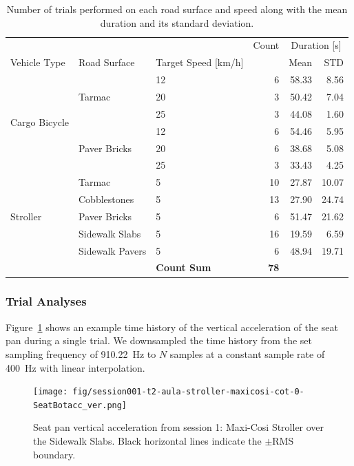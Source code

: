 \documentclass[a4paper]{article}
\begin{document}
%
\begin{table}
  \centering
  \caption{Number of trials performed on each road surface and speed along with
  the mean duration and its standard deviation.}
\begin{tabular}{lllrrr}
\toprule
 &  &  & Count & \multicolumn{2}{c}{Duration [s]}  \\
Vehicle Type & Road Surface & Target Speed [km/h] &  & Mean & STD  \\
\midrule
\multirow[t]{6}{*}{Cargo Bicycle} & \multirow[t]{3}{*}{Tarmac} & 12 & 6 & 58.33 & 8.56 \\
 &  & 20 & 3 & 50.42 & 7.04 \\
 &  & 25 & 3 & 44.08 & 1.60 \\
\cline{2-6}
 & \multirow[t]{3}{*}{Paver Bricks} & 12 & 6 & 54.46 & 5.95 \\
 &  & 20 & 6 & 38.68 & 5.08 \\
 &  & 25 & 3 & 33.43 & 4.25 \\
\cline{1-6} \cline{2-6}
\multirow[t]{5}{*}{Stroller} & Tarmac & 5 & 10 & 27.87 & 10.07 \\
\cline{2-6}
 & Cobblestones & 5 & 13 & 27.90 & 24.74 \\
\cline{2-6}
 & Paver Bricks & 5 & 6 & 51.47 & 21.62 \\
\cline{2-6}
 & Sidewalk Slabs & 5 & 16 & 19.59 & 6.59 \\
\cline{2-6}
 & Sidewalk Pavers & 5 & 6 & 48.94 & 19.71 \\
\cline{1-6} \cline{2-6}
 & & \textbf{Count Sum} & \textbf{78} & & \\
\bottomrule
\end{tabular}
  \label{tab:num-trials}
\end{table}

\subsubsection{Trial Analyses}
%
Figure~\ref{fig:vert-acc-example} shows an example time history of the vertical
acceleration of the seat pan during a single trial. We downsampled the time
history from the set sampling frequency of 910.22~\si{\hertz} to \(N\) samples
at a constant sample rate of 400~\si{\hertz} with linear interpolation.
%
\begin{figure}
  \centering
  \texttt{[image: fig/session001-t2-aula-stroller-maxicosi-cot-0-SeatBotacc\_ver.png]}
  \caption{Seat pan vertical acceleration from session 1: Maxi-Cosi Stroller over
  the Sidewalk Slabs. Black horizontal lines indicate the \(\pm\)RMS
  boundary.}
  \label{fig:vert-acc-example}
\end{figure}
\end{document}
